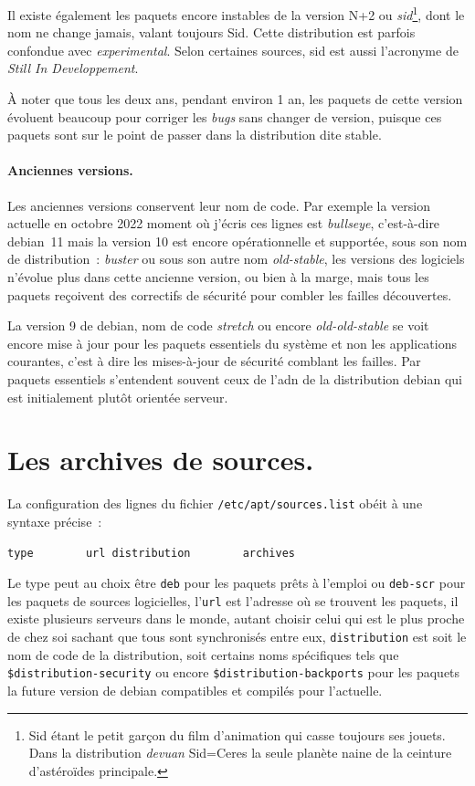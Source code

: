 \documentclass[12pt, a4paper]{report}
\begin{document}
Il existe également les paquets encore instables de la version N+2 ou \emph{sid}\footnote{Sid étant le petit garçon du film d'animation qui casse toujours ses jouets. Dans la distribution \emph{devuan} Sid=Ceres la seule planète naine de la ceinture d'astéroïdes principale.}, dont le nom ne change jamais, valant toujours Sid. 
Cette distribution est parfois confondue avec \emph{experimental\/}. 
Selon certaines sources, sid est aussi l'acronyme de \emph{Still In Developpement}.

À noter que tous les deux ans, pendant environ 1 an, les paquets de cette version évoluent beaucoup pour corriger les \emph{bugs\/} sans changer de version, puisque ces paquets sont sur le point de passer dans la distribution dite stable.

\paragraph{Anciennes versions.}
Les anciennes versions conservent leur nom de code. 
Par exemple la version actuelle en octobre 2022 moment où j'écris ces lignes est \emph{bullseye}, c'est-à-dire debian~11 mais la version 10 est encore opérationnelle et supportée, sous son nom de distribution~: \emph{buster} ou sous son autre nom \emph{old-stable}, les versions des logiciels n'évolue plus dans cette ancienne version, ou bien à la marge, mais tous les paquets reçoivent des correctifs de sécurité pour combler les failles découvertes.

La version 9 de debian, nom de code \emph{stretch\/} ou encore \emph{old-old-stable\/} se voit encore mise à jour pour les paquets essentiels du système et non les applications courantes, c'est à dire les mises-à-jour de sécurité comblant les failles. 
Par paquets essentiels s'entendent souvent ceux de l'adn de la distribution debian qui est initialement plutôt orientée serveur.

\section{Les archives de sources.}
La configuration des lignes du fichier \texttt{/etc/apt/sources.list\/} obéit à une syntaxe précise~:
\begin{verbatim}
type		url	distribution		archives
\end{verbatim}
Le type peut au choix être \texttt{deb} pour les paquets prêts à l'emploi ou \texttt{deb-scr} pour les paquets de sources logicielles, l'\texttt{url} est l'adresse où se trouvent les paquets, il existe plusieurs serveurs dans le monde, autant choisir celui qui est le plus proche de chez soi sachant que tous sont synchronisés entre eux, \texttt{distribution} est soit le nom de code de la distribution, soit certains noms spécifiques tels que \texttt{\$distribution-security} ou encore \texttt{\$distribution-backports} pour les paquets la future version de debian compatibles et compilés pour l'actuelle.
\end{document}
